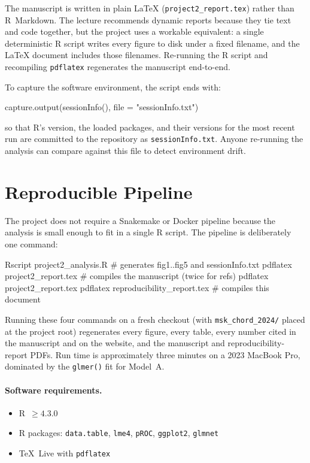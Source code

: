 \documentclass[11pt]{article}
\begin{document}
The manuscript is written in plain \LaTeX{} (\texttt{project2\_report.tex}) rather than R~Markdown. The lecture recommends dynamic reports because they tie text and code together, but the project uses a workable equivalent: a single deterministic R script writes every figure to disk under a fixed filename, and the \LaTeX{} document includes those filenames. Re-running the R script and recompiling \texttt{pdflatex} regenerates the manuscript end-to-end.

To capture the software environment, the script ends with:

\begin{code}
capture.output(sessionInfo(), file = "sessionInfo.txt")
\end{code}

\noindent so that R's version, the loaded packages, and their versions for the most recent run are committed to the repository as \texttt{sessionInfo.txt}. Anyone re-running the analysis can compare against this file to detect environment drift.

\section{Reproducible Pipeline}

The project does not require a Snakemake or Docker pipeline because the analysis is small enough to fit in a single R script. The pipeline is deliberately one command:

\begin{code}
Rscript project2_analysis.R          # generates fig1..fig5 and sessionInfo.txt
pdflatex project2_report.tex         # compiles the manuscript (twice for refs)
pdflatex project2_report.tex
pdflatex reproducibility_report.tex  # compiles this document
\end{code}

Running these four commands on a fresh checkout (with \texttt{msk\_chord\_2024/} placed at the project root) regenerates every figure, every table, every number cited in the manuscript and on the website, and the manuscript and reproducibility-report PDFs. Run time is approximately three minutes on a 2023 MacBook Pro, dominated by the \texttt{glmer()} fit for Model~A.

\paragraph{Software requirements.}
\begin{itemize}[leftmargin=*]
  \item R~$\geq 4.3.0$
  \item R packages: \texttt{data.table}, \texttt{lme4}, \texttt{pROC}, \texttt{ggplot2}, \texttt{glmnet}
  \item TeX~Live with \texttt{pdflatex}
\end{itemize}
\end{document}
